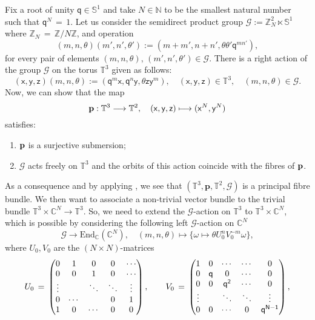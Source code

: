 \documentclass[reqno, a4paper, 10pt]{amsart}
\numberwithin{equation}{section}
\theoremstyle{plain}
\theoremstyle{definition}
\theoremstyle{remark}
\begin{document}
Fix a root of unity ${\mathsf{{q}}} \in \mathbb{S}^1$ 
and take $N \in \mathbb{N}$ to be  the smallest natural number such that ${\mathsf{{q}}}^N\,=\, 1$.  Let us consider the semidirect product group ${{\mathcal G}}:=\mathbb{Z}_N^2 \ltimes \mathbb{S}^1$ where $\mathbb{Z}_N\,=\, \mathbb{Z}/N\mathbb{Z}$,
and operation
$$
(m,n,\theta) (m',n',\theta') := (m+m',n+n',\theta\theta'{\mathsf{{q}}}^{mn'}),$$ for every pair of elements $(m,n,\theta),  \, (m',n',\theta') \in {{\mathcal G}}$.
There is a right  action of the group ${{\mathcal G}}$ on the torus $\mathbb{T}^3$ given as follows:
$$
 ({\mathsf{{x}}},{\mathsf{{y}}},{\mathsf{{z}}}) (m,n,\theta) := 
({\mathsf{{q}}}^m{\mathsf{{x}}}, {\mathsf{{q}}}^n {\mathsf{{y}}}, \theta {\mathsf{{z}}}{\mathsf{{y}}}^m), \quad ({\mathsf{{x}}}, {\mathsf{{y}}},{\mathsf{{z}}}) \in \mathbb{T}^3, \quad (m,n,\theta) \in {{\mathcal G}}.
$$
Now, we can show that the map 
$$
{\bf p} : \mathbb{T}^3 \longrightarrow \mathbb{T}^2, \quad  ({\mathsf{{x}}},{\mathsf{{y}}},{\mathsf{{z}}}) \longmapsto ({\mathsf{{x}}}^N,{\mathsf{{y}}}^N) 
$$
satisfies:
\begin{enumerate}
\item $\bf p$ is a surjective submersion;
\item ${{\mathcal G}}$ acts freely on $\mathbb{T}^3$ and the orbits of this action coincide with the fibres of $\bf p$.
\end{enumerate}
As a consequence and by applying \cite[Lemma 10.3]{Kolar/Michor/Slovak:1993}, we see that 
$(\mathbb{T}^3,\mathbf{p},\mathbb{T}^2,{{\mathcal G}})$ is a principal fibre bundle.  
We then 
want to associate a non-trivial vector bundle to the trivial bundle  $\mathbb{T}^3 \times \mathbb{C}^N \to \mathbb{T}^3$.  So, we need to extend the ${{\mathcal G}}$-action on   $\mathbb{T}^3$ to $\mathbb{T}^3 \times \mathbb{C}^N$, which 
is possible  by considering the following  left ${{\mathcal G}}$-action on $\mathbb{C}^N$
$$
 {{\mathcal G}} \longrightarrow  \mathrm{End}_{\mathbb{C}}(\mathbb{C}^N), \quad
(m,n,\theta) \longmapsto \big\{ \omega \longmapsto \theta U_0^nV_0^{-m}\omega \big\},
$$
where $U_0,V_0$ are the $(N\times N)$-matrices
$$
U_0\,=\, \begin{pmatrix} 0 & 1& 0 & 0 & \cdots \\ 0 & 0 & 1 & 0 & \cdots \\ \vdots &  & \ddots & \ddots & \vdots \\ 0 & \cdots &  & 0 & 1 \\ 1 & 0 & \cdots & 0  & 0 \end{pmatrix},
\qquad 
V_0\,=\, \begin{pmatrix} 1 & 0& \cdots & \cdots & 0 \\ 0 & {\mathsf{{q}}} & 0 & \cdots & 0 \\  0 & 0 &   \sf{q}^{2} & \cdots & 0 \\  \vdots &  & \ddots & \ddots & \vdots \\ 0 & 0 & \cdots & 0  & \sf{q}^{N-1} \end{pmatrix},
$$
\end{document}
